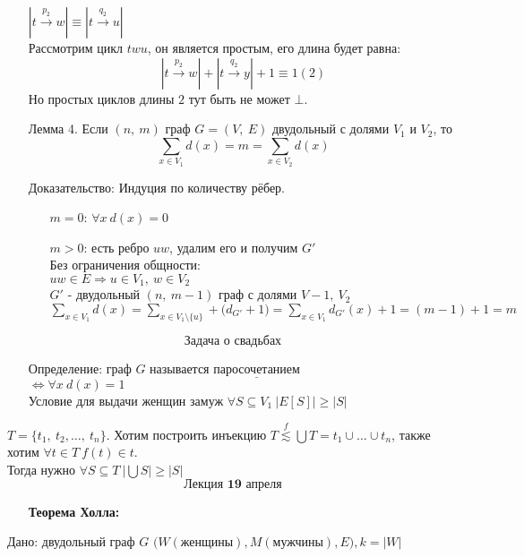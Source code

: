 \documentclass[12pt, letterpaper, twoside]{article}
\newcommand{\Underl}[1]{$\underline{\text{#1}}$}
\newcommand{\DS}{\displaystyle}
\newcommand{\Abs}[1]{\left| #1 \right|}
\begin{document}
\begin{enumerate}
        $\Abs{t \xrightarrow[]{p_2} w} \equiv \Abs{t \xrightarrow[]{q_2} u}$\\
        Рассмотрим цикл $twu$, он является простым, его длина будет равна:
        \[\Abs{t \xrightarrow[]{p_2} w} + \Abs{t \xrightarrow[]{q_2} y} + 1 \equiv 1 (2)\]
        Но простых циклов длины $2$ тут быть не может $\bot$.
        \item[Лемма 4.]
        Если $(n,\ m)$ граф $G = (V,\ E)$ двудольный с долями $V_1$ и $V_2$, то
        \[\sum_{x\in V_1} d(x) = m = \sum_{x \in V_2} d(x)\]
        \item[Доказательство:] Индуция по количеству рёбер.
        \begin{enumerate}
            \item[$m = 0$:] $\forall x\ d(x) = 0$
            \item[$m > 0$:] есть ребро $uw$, удалим его и получим $G'$\\
            Без ограничения общности:\\
            $uw \in E\Rightarrow u\in V_1,\ w\in V_2$\\
            $G'$ - двудольный $(n,\ m-1)$ граф с долями $V-1,\ V_2$\\
            $\DS\sum_{x \in V_1} d(x) = \sum_{x\in V_1\setminus \{u\}} + \big(d_{G'} + 1\big) = \sum_{x\in V_1} d_{G'} (x) + 1 = (m - 1) + 1 = m$
        \end{enumerate} 
    \end{enumerate}
    \[\text{Задача о свадьбах}\]
    \begin{enumerate}
        \item[Определение:] граф $G$ называется \Underl{паросочетанием}\\
        $\Leftrightarrow \forall x\ d(x) = 1$\\
        Условие для выдачи женщин замуж $\forall S\subseteq V_1\ \Abs{E[S]} \geq \Abs{S}$
    \end{enumerate}
    $T = \{t_1,\ t_2,\dots,\ t_n\}$. Хотим построить инъекцию $T \overset{f}{\lesssim} \bigcup T = t_1\cup\dots\cup t_n$, также хотим $\forall t\in T\ f(t) \in t$.\\
    Тогда нужно $\forall S \subseteq T\ \Abs{\bigcup S} \geq \Abs{S}$
    \[\textbf{Лекция 19 апреля}\]
\begin{enumerate}
    \item[\textbf{Теорема Холла:}]
\end{enumerate}
Дано: двудольный граф $G$ $\big(W (\text{женщины}), M (\text{мужчины}), E\big), k = |W|$\\
\end{document}
